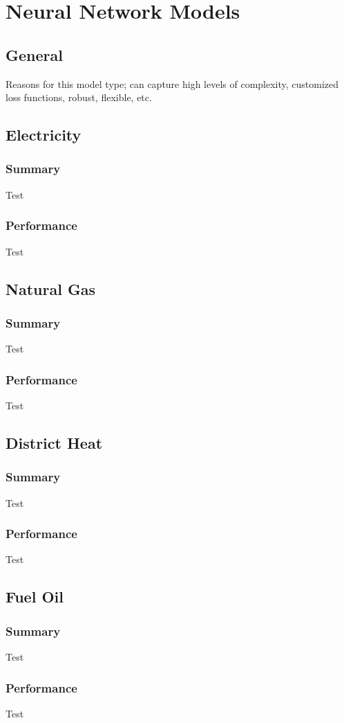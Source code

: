 \section*{Neural Network Models}
\label{sec:nn_models}

\subsection{General}
Reasons for this model type; can capture high levels of complexity, customized loss functions, robust, flexible, etc.

\subsection{Electricity}

\subsubsection{Summary}
Test

\subsubsection{Performance}
Test

\subsection{Natural Gas}

\subsubsection{Summary}
Test

\subsubsection{Performance}
Test

\subsection{District Heat}

\subsubsection{Summary}
Test

\subsubsection{Performance}
Test

\subsection{Fuel Oil}

\subsubsection{Summary}
Test

\subsubsection{Performance}
Test